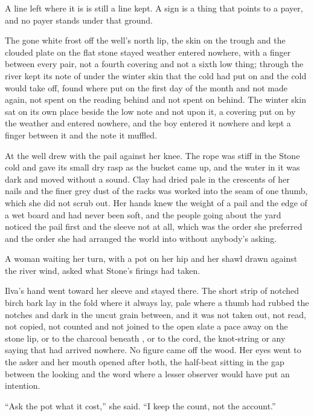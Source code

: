A line left where it is is still a line kept. A sign is a thing that points to a payer, and no payer stands under that ground.

The gone white frost off the well's north lip, the skin on the trough and the clouded plate on the flat stone stayed weather entered nowhere, with a finger between every pair, not a fourth covering and not a sixth low thing; through  the river kept its note of  under the winter skin that the cold had put on and the cold would take off, found where put on the first day of the month and not made again, not spent on the reading behind and not spent on  behind. The winter skin sat on its own place beside the low note and not upon it, a covering put on by the weather and entered nowhere, and the boy entered it nowhere and kept a finger between it and the note it muffled.

At the well  drew with the pail against her knee. The rope was stiff in the Stone cold and gave its small dry rasp as the bucket came up, and the water in it was dark and moved without a sound. Clay had dried pale in the crescents of her nails and the finer grey dust of the racks was worked into the seam of one thumb, which she did not scrub out. Her hands knew the weight of a pail and the edge of a wet board and had never been soft, and the people going about the yard noticed the pail first and the sleeve not at all, which was the order she preferred and the order she had arranged the world into without anybody's asking.

A woman waiting her turn, with a pot on her hip and her shawl drawn against the river wind, asked what Stone's firings had taken.

Ilva's hand went toward her sleeve and stayed there. The short strip of notched birch bark lay in the fold where it always lay, pale where a thumb had rubbed the notches and dark in the uncut grain between, and it was not taken out, not read, not copied, not counted and not joined to the open slate a pace away on the stone lip, or to the charcoal beneath , or to the cord, the knot-string or any saying that had arrived nowhere. No figure came off the wood. Her eyes went to the asker and her mouth opened after both, the half-beat sitting in the gap between the looking and the word where a lesser observer would have put an intention.

“Ask the pot what it cost,” she said. “I keep the count, not the account.”

